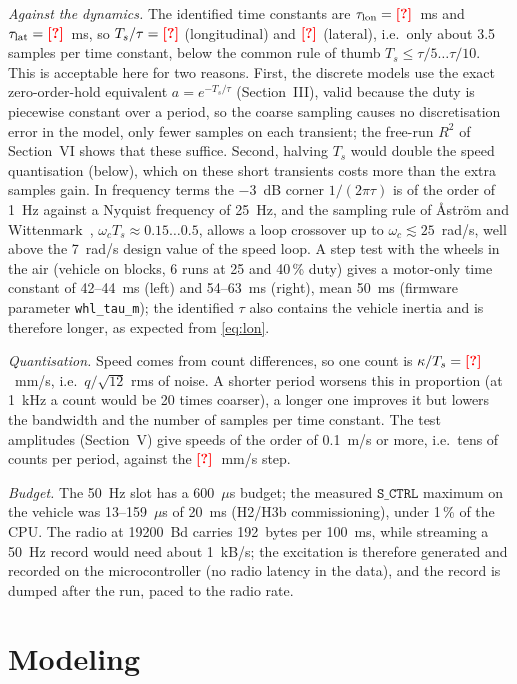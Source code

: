 \documentclass[conference]{IEEEtran}\newcommand{\haveieee}{}%
\newcommand{\todo}[1]{{\color{red}\textbf{[#1]}}}
\newcommand{\fallbackmacros}{\todo{?}}
\providecommand{\LonTauMs}{\fallbackmacros}\providecommand{\LonK}{\fallbackmacros}
\providecommand{\VquantMms}{\fallbackmacros}
\providecommand{\TsOverTauLon}{\fallbackmacros}\providecommand{\TsOverTauLat}{\fallbackmacros}
\begin{document}
\emph{Against the dynamics.} The identified time constants are $\tau_\mathrm{lon}=\LonTauMs$~ms and $\tau_\mathrm{lat}=\LatTauMs$~ms, so $T_s/\tau=\TsOverTauLon$ (longitudinal) and $\TsOverTauLat$ (lateral), i.e.\ only about 3.5 samples per time constant, below the common rule of thumb $T_s\le\tau/5\ldots\tau/10$. This is acceptable here for two reasons. First, the discrete models use the exact zero-order-hold equivalent $a=e^{-T_s/\tau}$ (Section~III), valid because the duty is piecewise constant over a period, so the coarse sampling causes no discretisation error in the model, only fewer samples on each transient; the free-run $R^2$ of Section~VI shows that these suffice. Second, halving $T_s$ would double the speed quantisation (below), which on these short transients costs more than the extra samples gain. In frequency terms the $-3$~dB corner $1/(2\pi\tau)$ is of the order of 1~Hz against a Nyquist frequency of 25~Hz, and the sampling rule of Åström and Wittenmark~\cite{astrom1997}, $\omega_cT_s\approx0.15\ldots0.5$, allows a loop crossover up to $\omega_c\lesssim25$~rad/s, well above the 7~rad/s design value of the speed loop. A step test with the wheels in the air (vehicle on blocks, 6 runs at 25 and 40\,\% duty) gives a motor-only time constant of 42--44~ms (left) and 54--63~ms (right), mean 50~ms (firmware parameter \texttt{whl\_tau\_m}); the identified $\tau$ also contains the vehicle inertia and is therefore longer, as expected from \eqref{eq:lon}.

\emph{Quantisation.} Speed comes from count differences, so one count is $\kappa/T_s=\VquantMms$~mm/s, i.e.\ $q/\sqrt{12}$ rms of noise. A shorter period worsens this in proportion (at 1~kHz a count would be 20 times coarser), a longer one improves it but lowers the bandwidth and the number of samples per time constant. The test amplitudes (Section~V) give speeds of the order of 0.1~m/s or more, i.e.\ tens of counts per period, against the $\VquantMms$~mm/s step.

\emph{Budget.} The 50~Hz slot has a 600~$\mu$s budget; the measured $\texttt{S\_CTRL}$ maximum on the vehicle was 13--159~$\mu$s of 20~ms (H2/H3b commissioning), under 1\,\% of the CPU. The radio at 19200~Bd carries 192~bytes per 100~ms, while streaming a 50~Hz record would need about 1~kB/s; the excitation is therefore generated and recorded on the microcontroller (no radio latency in the data), and the record is dumped after the run, paced to the radio rate.

\section{Modeling}
\end{document}
